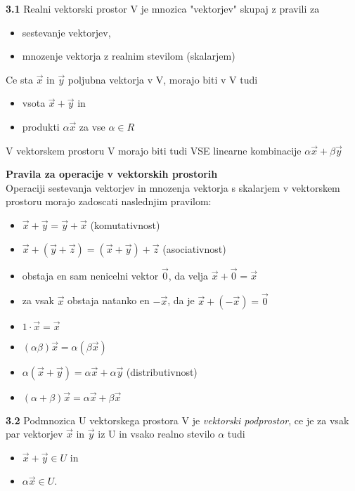 \documentclass{article}
\begin{document}
\begin{multicols}{2}
\textbf{3.1} Realni vektorski prostor V je mnozica "vektorjev" skupaj z pravili za
\begin{itemize}
    \item sestevanje vektorjev,
    \item mnozenje vektorja z realnim stevilom (skalarjem)
\end{itemize}
Ce sta $\vec{x}$ in $\vec{y}$ poljubna vektorja v V, morajo biti v V tudi
\begin{itemize}
    \item vsota $\vec{x} + \vec{y}$ in 
    \item produkti $\alpha\vec{x}$ za vse $\alpha \in R$
\end{itemize}
V vektorskem prostoru V morajo biti tudi VSE linearne kombinacije
$\alpha\vec{x} + \beta\vec{y}$

\textbf{Pravila za operacije v vektorskih prostorih}\\
Operaciji sestevanja vektorjev in mnozenja vektorja s skalarjem v vektorskem prostoru
morajo zadoscati naslednjim pravilom:
\begin{itemize}
    \item $\vec{x} + \vec{y} = \vec{y} + \vec{x}$ (komutativnost)
    \item $\vec{x} + (\vec{y} + \vec{z}) = (\vec{x} + \vec{y}) + \vec{z}$ (asociativnost)
    \item obstaja en sam nenicelni vektor $\vec{0}$, da velja $\vec{x} + \vec{0} = \vec{x}$
    \item za vsak $\vec{x}$ obstaja natanko en $-\vec{x}$, da je $\vec{x} + (-\vec{x}) = \vec{0}$
    \item $1 \cdot \vec{x} = \vec{x}$
    \item $(\alpha\beta)\vec{x} = \alpha(\beta\vec{x})$
    \item $\alpha(\vec{x} + \vec{y}) = \alpha\vec{x} + \alpha\vec{y}$ (distributivnost)
    \item $(\alpha + \beta)\vec{x} = \alpha\vec{x} + \beta\vec{x}$
\end{itemize}

\textbf{3.2} Podmnozica U vektorskega prostora V je \textit{vektorski podprostor}, ce je za
vsak par vektorjev $\vec{x}$ in $\vec{y}$ iz U in vsako realno stevilo $\alpha$ tudi
\begin{itemize}
    \item $\vec{x} + \vec{y} \in U$ in
    \item $\alpha\vec{x} \in U$.
\end{itemize}


\end{multicols}
\end{document}
